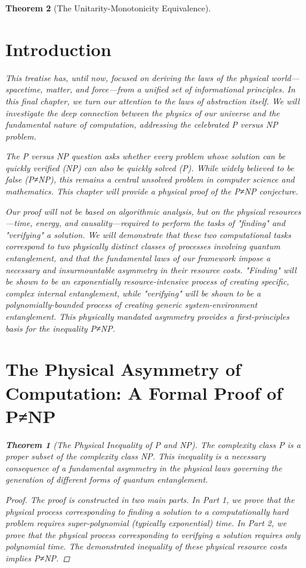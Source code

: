 \documentclass[11pt, letterpaper]{report}
\theoremstyle{plain} %
\newtheorem{theorem}{Theorem}[chapter]
\theoremstyle{definition} %
\theoremstyle{remark} %
\begin{document}
\begin{theorem}[The Unitarity-Monotonicity Equivalence]
\section{Introduction}

This treatise has, until now, focused on deriving the laws of the physical world—spacetime, matter, and force—from a unified set of informational principles. In this final chapter, we turn our attention to the laws of abstraction itself. We will investigate the deep connection between the physics of our universe and the fundamental nature of computation, addressing the celebrated P versus NP problem.

The P versus NP question asks whether every problem whose solution can be quickly verified (NP) can also be quickly solved (P). While widely believed to be false (P≠NP), this remains a central unsolved problem in computer science and mathematics. This chapter will provide a physical proof of the P≠NP conjecture.

Our proof will not be based on algorithmic analysis, but on the physical resources—time, energy, and causality—required to perform the tasks of "finding" and "verifying" a solution. We will demonstrate that these two computational tasks correspond to two physically distinct classes of processes involving quantum entanglement, and that the fundamental laws of our framework impose a necessary and insurmountable asymmetry in their resource costs. "Finding" will be shown to be an exponentially resource-intensive process of creating specific, complex internal entanglement, while "verifying" will be shown to be a polynomially-bounded process of creating generic system-environment entanglement. This physically mandated asymmetry provides a first-principles basis for the inequality P≠NP.

\section{The Physical Asymmetry of Computation: A Formal Proof of P≠NP}
\label{sec:pnp_proof}

\begin{theorem}[The Physical Inequality of P and NP]
\label{thm:p_ne_np}
The complexity class P is a proper subset of the complexity class NP. This inequality is a necessary consequence of a fundamental asymmetry in the physical laws governing the generation of different forms of quantum entanglement.
\end{theorem}
\begin{proof}
The proof is constructed in two main parts. In Part 1, we prove that the physical process corresponding to finding a solution to a computationally hard problem requires super-polynomial (typically exponential) time. In Part 2, we prove that the physical process corresponding to verifying a solution requires only polynomial time. The demonstrated inequality of these physical resource costs implies P≠NP.


\end{proof}
\end{theorem}
\end{document}
